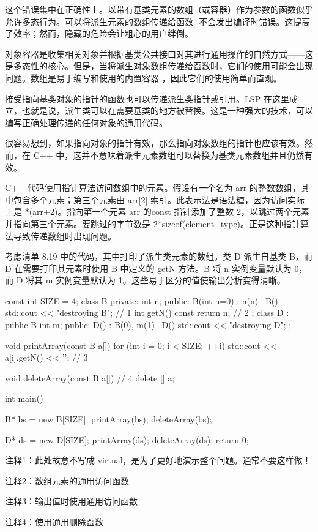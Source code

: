 这个错误集中在正确性上。以带有基类元素的数组（或容器）作为参数的函数似乎允许多态行为。可以将派生元素的数组传递给函数- 不会发出编译时错误。这提高了效率；然而，隐藏的危险会让粗心的用户绊倒。

对象容器是收集相关对象并根据基类公共接口对其进行通用操作的自然方式——这是多态性的核心。但是，当将派生对象数组传递给函数时，它们的使用可能会出现问题。数组是易于编写和使用的内置容器 ，因此它们的使用简单而直观。


接受指向基类对象的指针的函数也可以传递派生类指针或引用。LSP 在这里成立，也就是说，派生类可以在需要基类的地方被替换。这是一种强大的技术，可以编写正确处理传递的任何对象的通用代码。

很容易想到，如果指向对象的指针有效，那么指向对象数组的指针也应该有效。然而，在 C++ 中，这并不意味着派生元素数组可以替换为基类元素数组并且仍然有效。

C++ 代码使用指针算法访问数组中的元素。假设有一个名为 arr 的整数数组，其中包含多个元素；第三个元素由 arr[2] 索引。此表示法是语法糖，因为访问实际上是 *(arr+2)。指向第一个元素 arr 的const 指针添加了整数 2，以跳过两个元素并指向第三个元素。要跳过的字节数是 2*sizeof(element\_type)。正是这种指针算法导致传递数组时出现问题。

考虑清单 8.19 中的代码，其中打印了派生类元素的数组。类 D 派生自基类 B，而 D 在需要打印其元素时使用 B 中定义的 getN 方法。B 将 n 实例变量默认为 0，而 D 将其 m 实例变量默认为 1。这些易于区分的值使输出分析变得清晰。


\begin{cpp}
const int SIZE = 4;
class B {
private:
  int n;
public:
  B(int n=0) : n(n) {}
  ~B() { std::cout << "destroying B\n"; } // 1
int getN() const { return n; } // 2
};
class D : public B {
  int m;
public:
  D() : B(0), m(1) {}
  ~D() { std::cout << "destroying D\n"; }
};

void printArray(const B a[]) {
  for (int i = 0; i < SIZE; ++i)
    std::cout << a[i].getN() << '\n'; // 3
}

void deleteArray(const B a[]) { // 4
  delete [] a;
}

int main() {
  B* bs = new B[SIZE];
  printArray(bs);
  deleteArray(bs);

  D* ds = new D[SIZE];
  printArray(ds);
  deleteArray(ds);
  return 0;
}
\end{cpp}

{\footnotesize
注释1：此处故意不写成 virtual，是为了更好地演示整个问题。通常不要这样做！

注释2：数组元素的通用访问函数

注释3：输出值时使用通用访问函数

注释4：使用通用删除函数
}

